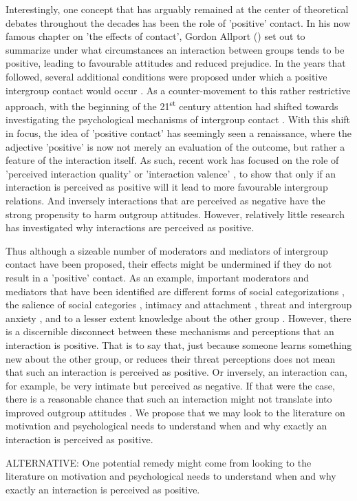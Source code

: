 Interestingly, one concept that has arguably remained at the center of theoretical debates throughout the decades has been the role of 'positive' contact. In his now famous chapter on 'the effects of contact', Gordon Allport (\citeyear{Allport1954b}) set out to summarize under what circumstances an interaction between groups tends to be positive, leading to favourable attitudes and reduced prejudice. In the years that followed, several additional conditions were proposed under which a positive intergroup contact would occur \citep[for a critical review see][]{Pettigrew1986}. As a counter-movement to this rather restrictive approach, with the beginning of the 21\textsuperscript{st} century attention had shifted towards investigating the psychological mechanisms of intergroup contact \citep[e.g. see,][]{Paolini2021}. With this shift in focus, the idea of 'positive contact' has seemingly seen a renaissance, where the adjective 'positive' is now not merely an evaluation of the outcome, but rather a feature of the interaction itself. As such, recent work has focused on the role of 'perceived interaction quality' \citep[e.g.,][]{Brown2007, Voci2003} or 'interaction valence' \citep[e.g.,][]{Tropp2016, Barlow2012}, to show that only if an interaction is perceived as positive will it lead to more favourable intergroup relations. And inversely interactions that are perceived as negative have the strong propensity to harm outgroup attitudes. However, relatively little research has investigated why interactions are perceived as positive.

Thus although a sizeable number of moderators and mediators of intergroup contact have been proposed, their effects might be undermined if they do not result in a 'positive' contact. As an example, important moderators and mediators that have been identified are different forms of social categorizations \citep[][]{Pettigrew1998}, the salience of social categories \citep[][]{Brown2005}, intimacy \citep[e.g.,][]{Marinucci2021} and attachment \citep[e.g.,][]{Tropp2021}, threat and intergroup anxiety \citep[e.g.,][]{Stephan2008, Paolini2004}, and to a lesser extent knowledge about the other group \citep[][]{Pettigrew2008c}. However, there is a discernible disconnect between these mechanisms and perceptions that an interaction is positive. That is to say that, just because someone learns something new about the other group, or reduces their threat perceptions does not mean that such an interaction is perceived as positive. Or inversely, an interaction can, for example, be very intimate but perceived as negative. If that were the case, there is a reasonable chance that such an interaction might not translate into improved outgroup attitudes \citep[e.g.,][]{Barlow2012}. We propose that we may look to the literature on motivation and psychological needs to understand when and why exactly an interaction is perceived as positive.


ALTERNATIVE: One potential remedy might come from looking to the literature on motivation and psychological needs to understand when and why exactly an interaction is perceived as positive. 